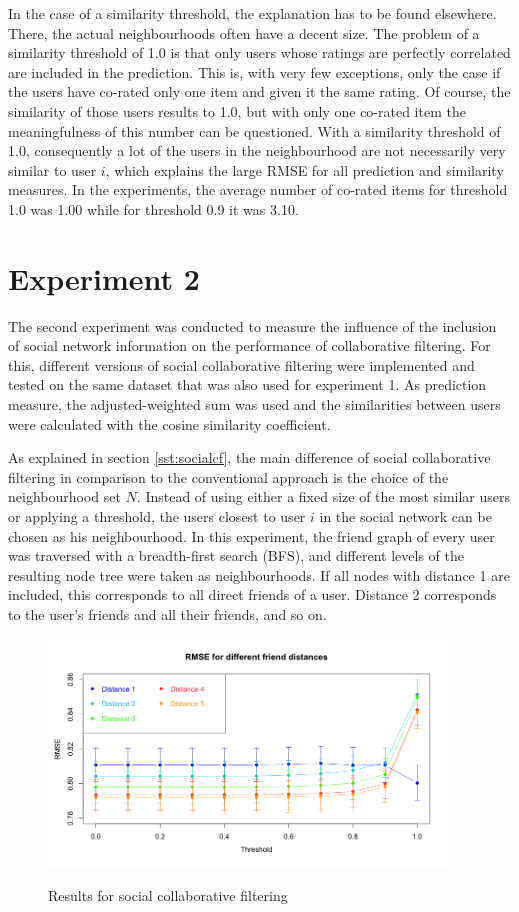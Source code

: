 In the case of a similarity threshold, the explanation has to be found elsewhere. There, the actual neighbourhoods often have a decent size. The problem of a similarity threshold of 1.0 is that only users whose ratings are perfectly correlated are included in the prediction. This is, with very few exceptions, only the case if the users have co-rated only one item and given it the same rating. Of course, the similarity of those users results to 1.0, but with only one co-rated item the meaningfulness of this number can be questioned. With a similarity threshold of 1.0, consequently a lot of the users in the neighbourhood are not necessarily very similar to user $i$, which explains the large RMSE for all prediction and similarity measures. In the experiments, the average number of co-rated items for threshold 1.0 was 1.00 while for threshold 0.9 it was 3.10.
\section{Experiment 2}
\label{st:experiment2} The second experiment was conducted to measure the influence of the inclusion of social network information on the performance of collaborative filtering. For this, different versions of social collaborative filtering were implemented and tested on the same dataset that was also used for experiment 1. As prediction measure, the adjusted-weighted sum was used and the similarities between users were calculated with the cosine similarity coefficient.

As explained in section \ref{sst:socialcf}, the main difference of social collaborative filtering in comparison to the conventional approach is the choice of the neighbourhood set $N$. Instead of using either a fixed size of the most similar users or applying a threshold, the users closest to user $i$ in the social network can be chosen as his neighbourhood. In this experiment, the friend graph of every user was traversed with a breadth-first search (BFS), and different levels of the resulting node tree were taken as neighbourhoods. If all nodes with distance 1 are included, this corresponds to all direct friends of a user. Distance 2 corresponds to the user's friends and all their friends, and so on.

\begin{figure}[!ht]
\includegraphics[width=400px]{./4-experiments/figures/SOCIALUSERBASED_V3.png}
\label{f:socialuserbased}
\caption{Results for social collaborative filtering}
\end{figure}

